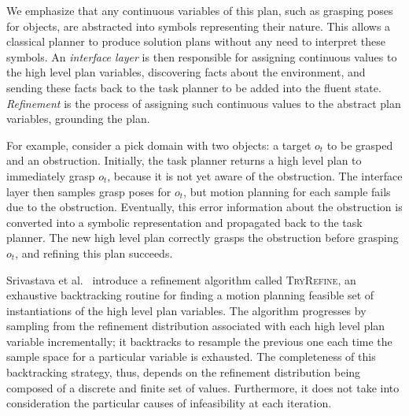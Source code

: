
We emphasize that any continuous variables of this plan, such as grasping poses for
objects, are abstracted into symbols representing their nature. This allows a
classical planner to produce solution plans without any need to interpret these
symbols. An \emph{interface layer} is then responsible for assigning continuous values to
the high level plan variables, discovering facts about the environment, and sending
these facts back to the task planner to be added into the fluent state. \emph{Refinement} is the
process of assigning such continuous values to the abstract plan variables, grounding the plan. 

For example, consider a pick domain with two objects: a target $o_{t}$ to be grasped and an obstruction.
Initially, the task planner returns a high level plan to immediately grasp $o_{t}$, because
it is not yet aware of the obstruction. The interface layer then samples grasp poses
for $o_{t}$, but motion planning for each sample fails due to the obstruction. Eventually,
this error information about the obstruction is converted into a symbolic representation
and propagated back to the task planner. The new high level plan correctly grasps the obstruction
before grasping $o_{t}$, and refining this plan succeeds.

Srivastava et al.~\cite{srivastava2014combined} introduce a refinement algorithm called \textsc{TryRefine}, an exhaustive backtracking routine for
finding a motion planning feasible set of instantiations of the high level plan
variables. The algorithm progresses by sampling from the refinement
distribution associated with each high level plan variable incrementally; it backtracks
to resample the previous one each time the sample space for a particular variable
is exhausted. The completeness of this backtracking strategy, thus, depends on the refinement distribution
being composed of a discrete and finite set of values. Furthermore, it does not take into consideration
the particular causes of infeasibility at each iteration.